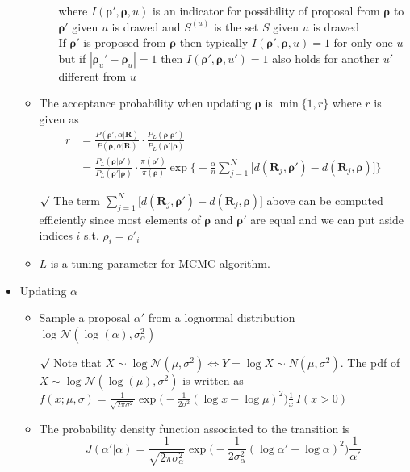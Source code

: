 \documentclass[12pt]{article}
\newcommand{\rmk}{$\surd$}
\begin{document}
\begin{itemize}
\begin{itemize}
\begin{itemize}
            where $I(\boldsymbol{\rho}', \boldsymbol{\rho}, u)$ is an indicator for possibility of proposal from $\boldsymbol{\rho}$ to $\boldsymbol{\rho}'$ given $u$ is drawed and $S^{(u)}$ is the set $S$ given $u$ is drawed \\ If $\boldsymbol{\rho}'$ is proposed from $\boldsymbol{\rho}$ then typically $I(\boldsymbol{\rho}', \boldsymbol{\rho}, u)=1$ for only one $u$ but if $|\boldsymbol{\rho}_u'-\boldsymbol{\rho}_u|=1$ then $I(\boldsymbol{\rho}', \boldsymbol{\rho}, u')=1$ also holds for another $u'$ different from $u$ 
        \end{itemize} 
        \item The acceptance probability when updating $\boldsymbol{\rho}$ is 
        $\min\{1, r\}$ where $r$ is given as 
        \begin{align*}
            r &=\frac{P(\boldsymbol{\rho}', \alpha | \mathbf{R})}{P(\boldsymbol{\rho}, \alpha | \mathbf{R})}\cdot \frac{P_L(\boldsymbol{\rho}|\boldsymbol{\rho}')}{P_L(\boldsymbol{\rho}'|\boldsymbol{\rho})} \\ &= \frac{P_L(\boldsymbol{\rho}|\boldsymbol{\rho}')}{P_L(\boldsymbol{\rho}'|\boldsymbol{\rho})} \cdot \frac{\pi(\boldsymbol{\rho}')}{\pi(\boldsymbol{\rho})}\exp\big\{-\frac{\alpha}{n}\sum_{j=1}^N \big[d(\mathbf{R}_j, \boldsymbol{\rho}')-d(\mathbf{R}_j, \boldsymbol{\rho})\big] \big\}
        \end{align*} 
        \item[\rmk] The term $\sum_{j=1}^N \big[d(\mathbf{R}_j, \boldsymbol{\rho}')-d(\mathbf{R}_j, \boldsymbol{\rho})\big]$ above can be computed efficiently since most elements of $\boldsymbol{\rho}$ and $\boldsymbol{\rho}'$ are equal and we can put aside indices $i$ s.t. $\rho_i=\rho'_i$
        \item $L$ is a tuning parameter for MCMC algorithm.  
    \end{itemize}
    \item Updating $\alpha$
    \begin{itemize}
        \item Sample a proposal $\alpha '$ from a lognormal distribution $\log\mathcal{N}(\log(\alpha), \sigma_\alpha^2)$
        \item[\rmk]  Note that $X\sim \log\mathcal{N}(\mu, \sigma^2)\Leftrightarrow Y=\log X\sim N(\mu, \sigma^2)$. The pdf of $X\sim \log\mathcal{N}(\log(\mu), \sigma^2)$ is written as $f(x ; \mu, \sigma)=\frac{1}{\sqrt{2\pi \sigma^2}}\exp\bigl(-\frac{1}{2\sigma^2}(\log x -\log \mu)^2 \bigr)\frac{1}{x}\,I(x>0)$
        \item The probability density function associated to the transition is $$J(\alpha'|\alpha)=\frac{1}{\sqrt{2\pi \sigma_\alpha^2}}\exp\bigl(-\frac{1}{2\sigma_\alpha^2}(\log \alpha' -\log \alpha)^2 \bigr)\frac{1}{\alpha'}$$

\end{itemize}
\end{itemize}
\end{document}
